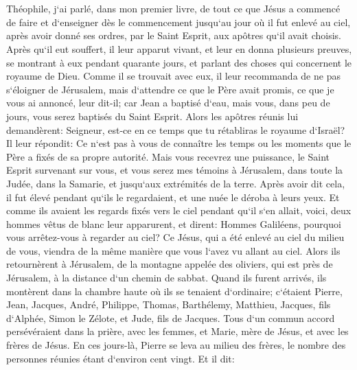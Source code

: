 

\chapter{}

\verse Théophile, j`ai parlé, dans mon premier livre, de tout ce que Jésus a commencé de faire et d`enseigner dès le commencement 
\verse jusqu`au jour où il fut enlevé au ciel, après avoir donné ses ordres, par le Saint Esprit, aux apôtres qu`il avait choisis. 
\verse Après qu`il eut souffert, il leur apparut vivant, et leur en donna plusieurs preuves, se montrant à eux pendant quarante jours, et parlant des choses qui concernent le royaume de Dieu. 
\verse Comme il se trouvait avec eux, il leur recommanda de ne pas s`éloigner de Jérusalem, mais d`attendre ce que le Père avait promis, ce que je vous ai annoncé, leur dit-il; 
\verse car Jean a baptisé d`eau, mais vous, dans peu de jours, vous serez baptisés du Saint Esprit. 
\verse Alors les apôtres réunis lui demandèrent: Seigneur, est-ce en ce temps que tu rétabliras le royaume d`Israël? 
\verse Il leur répondit: Ce n`est pas à vous de connaître les temps ou les moments que le Père a fixés de sa propre autorité. 
\verse Mais vous recevrez une puissance, le Saint Esprit survenant sur vous, et vous serez mes témoins à Jérusalem, dans toute la Judée, dans la Samarie, et jusqu`aux extrémités de la terre. 
\verse Après avoir dit cela, il fut élevé pendant qu`ils le regardaient, et une nuée le déroba à leurs yeux. 
\verse Et comme ils avaient les regards fixés vers le ciel pendant qu`il s`en allait, voici, deux hommes vêtus de blanc leur apparurent, 
\verse et dirent: Hommes Galiléens, pourquoi vous arrêtez-vous à regarder au ciel? Ce Jésus, qui a été enlevé au ciel du milieu de vous, viendra de la même manière que vous l`avez vu allant au ciel. 
\verse Alors ils retournèrent à Jérusalem, de la montagne appelée des oliviers, qui est près de Jérusalem, à la distance d`un chemin de sabbat. 
\verse Quand ils furent arrivés, ils montèrent dans la chambre haute où ils se tenaient d`ordinaire; c`étaient Pierre, Jean, Jacques, André, Philippe, Thomas, Barthélemy, Matthieu, Jacques, fils d`Alphée, Simon le Zélote, et Jude, fils de Jacques. 
\verse Tous d`un commun accord persévéraient dans la prière, avec les femmes, et Marie, mère de Jésus, et avec les frères de Jésus. 
\verse En ces jours-là, Pierre se leva au milieu des frères, le nombre des personnes réunies étant d`environ cent vingt. Et il dit: 
